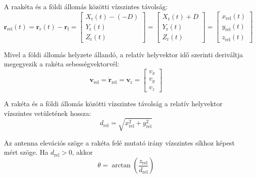 A raakéta és a földi állomás közötti vízszintes távolság:
\begin{equation}
    \boldsymbol{r}_{\mathrm{rel}}(t)
    = \boldsymbol{r}_{\mathrm{r}}(t)-\boldsymbol{r}_{\mathrm{f}}
    = \begin{bmatrix}
        X_{\mathrm{r}}(t)-(-D) \\
        Y_{\mathrm{r}}(t) \\
        Z_{\mathrm{r}}(t)
      \end{bmatrix}
    = \begin{bmatrix}
        X_{\mathrm{r}}(t)+D \\
        Y_{\mathrm{r}}(t) \\
        Z_{\mathrm{r}}(t)
      \end{bmatrix}
    = \begin{bmatrix}
        x_{\mathrm{rel}}(t) \\
        y_{\mathrm{rel}}(t) \\
        z_{\mathrm{rel}}(t)
      \end{bmatrix}
    \label{eq:kovetes-relativ-pozicio}
\end{equation}


Mivel a földi állomás helyzete állandó, a relatív helyvektor idő szerinti
deriváltja megegyezik a rakéta sebességvektorvél:
\begin{equation}
    \boldsymbol{v}_{\mathrm{rel}}
    = \dot{\boldsymbol{r}}_{\mathrm{rel}}
    = \boldsymbol{v}_{\mathrm{r}}
    = \begin{bmatrix} v_x \\ v_y \\ v_z \end{bmatrix}
    \label{eq:kovetes-relativ-sebesseg}
\end{equation}

A rakéta és a földi állomás közötti vízszintes távolság
a relatív helyvektor vízszintes vetületének hossza:
\begin{equation}
    d_{\mathrm{rel}}
    = \sqrt{x_{\mathrm{rel}}^2+y_{\mathrm{rel}}^2}
    \label{eq:kovetes-vizszintes-tavolsag}
\end{equation}


Az antenna elevációs szöge a rakéta felé mutató irány
vízszintes síkhoz képest mért szöge. Ha $d_{\mathrm{rel}}>0$,
akkor
\begin{equation}
    \theta = \arctan\!\left(\frac{z_{\mathrm{rel}}}{d_{\mathrm{rel}}}\right)
    \label{eq:kovetes-elevacio}
\end{equation}

